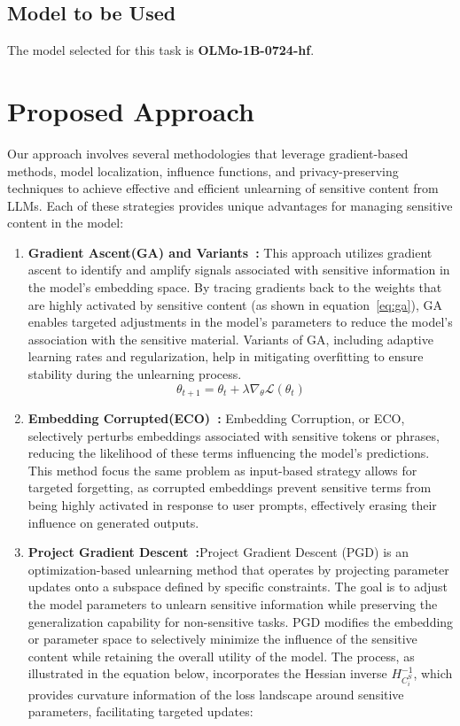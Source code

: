 \documentclass[11pt]{article}
\begin{document}
    \subsection{Model to be Used}
    The model selected for this task is \textbf{OLMo-1B-0724-hf}.


    \section{Proposed Approach}
    Our approach involves several methodologies that leverage gradient-based methods, model localization, influence functions, and privacy-preserving techniques to achieve effective and efficient unlearning of sensitive content from LLMs. Each of these strategies provides unique advantages for managing sensitive content in the model:
    \begin{enumerate}
        \item \textbf{Gradient Ascent(GA) and Variants~\cite{yao2024largelanguagemodelunlearning}:} This approach utilizes gradient ascent to identify and amplify signals associated with sensitive information in the model's embedding space. By tracing gradients back to the weights that are highly activated by sensitive content (as shown in equation~\ref{eq:ga}), GA enables targeted adjustments in the model's parameters to reduce the model’s association with the sensitive material. Variants of GA, including adaptive learning rates and regularization, help in mitigating overfitting to ensure stability during the unlearning process.
        \begin{equation}
            \theta_{t+1} = \theta_t + \lambda \nabla_{\theta} \mathcal{L}(\theta_t)
            \label{eq:ga}
        \end{equation}
        \item \textbf{Embedding Corrupted(ECO)~\cite{liu2024largelanguagemodelunlearning}:} Embedding Corruption, or ECO, selectively perturbs embeddings associated with sensitive tokens or phrases, reducing the likelihood of these terms influencing the model’s predictions. This method focus the same problem as input-based strategy allows for targeted forgetting, as corrupted embeddings prevent sensitive terms from being highly activated in response to user prompts, effectively erasing their influence on generated outputs.
        \item \textbf{Project Gradient Descent~\cite{Wei2024ProvableUI}:}Project Gradient Descent (PGD) is an optimization-based unlearning method that operates by projecting parameter updates onto a subspace defined by specific constraints. The goal is to adjust the model parameters to unlearn sensitive information while preserving the generalization capability for non-sensitive tasks. PGD modifies the embedding or parameter space to selectively minimize the influence of the sensitive content while retaining the overall utility of the model. The process, as illustrated in the equation below, incorporates the Hessian inverse \( H_{C_i^S}^{-1} \), which provides curvature information of the loss landscape around sensitive parameters, facilitating targeted updates:


\end{enumerate}
\end{document}
